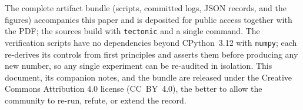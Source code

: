 The complete artifact bundle (scripts, committed logs, JSON records, and
the figures) accompanies this paper and is deposited for public access
together with the PDF; the sources build with \texttt{tectonic} and a
single command. The verification scripts have no dependencies beyond
CPython~3.12 with \texttt{numpy}; each re-derives its controls from
first principles and asserts them before producing any new number, so
any single experiment can be re-audited in isolation. This document, its
companion notes, and the bundle are released under the Creative Commons
Attribution 4.0 license (CC~BY~4.0), the better to allow the community
to re-run, refute, or extend the record.
